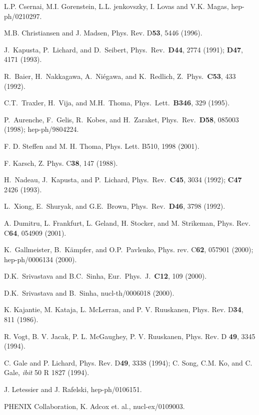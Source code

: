 \begin{thebibliography}{00}
 L.P. Csernai, M.I. Gorenstein, L.L. jenkovszky, 
                        I. Lovas and V.K. Magas, hep-ph/0210297.


 M.B. Christiansen and J. Madsen,
           Phys. Rev. D{\bf 53}, 5446 (1996).

 J.\ Kapusta, P.\ Lichard, and D.\ Seibert, 
   Phys.\ Rev.\ {\bf D44}, 2774 (1991); {\bf D47}, 4171 (1993). 

 R.\ Baier, H.\ Nakkagawa, A.\ Ni\'{e}gawa, and
K.\ Redlich, Z.\ Phys.\ {\bf C53}, 433 (1992).

 C.T.\ Traxler, H.\ Vija, and M.H.\ Thoma,
Phys.\ Lett.\ {\bf B346}, 329 (1995).
  
 P.\ Aurenche, F.\ Gelis, R.\ Kobes, and H.\ Zaraket,
  Phys.\ Rev.\ {\bf D58}, 085003 (1998); \mbox{hep-ph/9804224}. 

 F. D. Steffen and M. H. Thoma, Phys. Lett. B510, 
                  1998 (2001).
                  
 F. Karsch, Z. Phys. C{\bf 38}, 147 (1988).
  
 H.\ Nadeau, J.\ Kapusta, and P.\ Lichard,
Phys.\ Rev.\ {\bf C45}, 3034 (1992); {\bf C47} 2426 (1993).

 L.\ Xiong, E.\ Shuryak, and G.E.\ Brown, Phys.\
Rev.\ {\bf D46}, 3798 (1992).

 A. Dumitru, L. Frankfurt, L. Geland, H. Stocker, and
               M. Strikeman, Phys. Rev. C{\bf 64}, 054909 (2001).

 K.\ Gallmeister, B.\ K\"ampfer, and O.P.\ Pavlenko, 
            Phys. rev. C{\bf 62}, 057901 (2000); hep-ph/0006134 (2000).

 D.K.\ Srivastava and B.C.\ Sinha,
             Eur.\ Phys.\ J.\ {\bf C12}, 109 (2000).

 D.K.\ Srivastava and B.\ Sinha, nucl-th/0006018 (2000).

 K. Kajantie, M. Kataja, L. McLerran, and P. V. Ruuskanen,
               Phys. Rev. D{\bf 34}, 811 (1986).

 R. Vogt, B. V. Jacak, P. L. McGaughey, P. V. Ruuskanen,
          Phys. Rev. D {\bf 49}, 3345 (1994).
          
 C. Gale and P. Lichard, Phys. Rev. D{\bf 49}, 3338 (1994);
               C. Song, C.M. Ko, and C. Gale, {\it ibit} 50 R 1827 (1994).

 J. Letessier and J. Rafelski, hep-ph/0106151.

 PHENIX Collaboration, K. Adcox et. al., 
                    nucl-ex/0109003.

\end{thebibliography}






